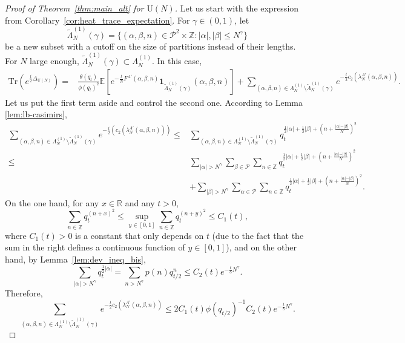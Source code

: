 \documentclass[11pt,a4paper,reqno]{article}
\theoremstyle{definition}
\theoremstyle{remark}
\newcommand\U{{\mathrm U}}
\newcommand\Z{{\mathbb Z}}
\newcommand\R{\mathbb{R}}
\newcommand\Tr{\mathrm{Tr}}
\newcommand\Pfr{\mathscr{P}}
\newcommand\E{\mathbb{E}}
\begin{document}
\begin{proof}[Proof of Theorem~\ref{thm:main_alt} for $\U(N)$]
Let us start with the expression from Corollary~\ref{cor:heat_trace_expectation}. For $\gamma\in(0,1)$, let
\[
\tilde{\Lambda}_N^{(1)}(\gamma)=\{(\alpha,\beta,n)\in\Pfr^2\times\Z:\vert\alpha\vert,\vert\beta\vert\leq N^\gamma\}
\]
be a new subset with a cutoff on the size of partitions instead of their lengths. For $N$ large enough, $\tilde{\Lambda}_N^{(1)}(\gamma)\subset\Lambda_N^{(1)}$. In this case, \begin{align*}
\Tr(e^{\frac{t}{2}\Delta_{\U(N)}})= & \frac{\theta(q_t)}{\phi(q_t)^2}\E\left[e^{-\frac{t}{N}F^{A'}(\alpha,\beta,n)}\mathbf{1}_{\tilde{\Lambda}_N^{(1)}(\gamma)}(\alpha,\beta,n)\right]+\sum_{(\alpha,\beta,n)\in\Lambda_N^{(1)}\setminus\tilde{\Lambda}_N^{(1)}(\gamma)} e^{-\frac{t}{2}c_2(\lambda_N^{A'}(\alpha,\beta,n))}.
\end{align*}
Let us put the first term aside and control the second one. According to Lemma \ref{lem:lb-casimirs},
\begin{align*}
\sum_{(\alpha,\beta,n)\in\Lambda_N^{(1)}\setminus\tilde{\Lambda}_N^{(1)}(\gamma)} e^{-\frac{t}{2}\left(c_2(\lambda_N^{A'}(\alpha,\beta,n))\right)}
 \leq & \sum_{(\alpha,\beta,n)\in\Lambda_N^{(1)}\setminus\tilde{\Lambda}_N^{(1)}(\gamma)} q_t^{\frac12\vert\alpha\vert+\frac12\vert\beta\vert+\left(n+\frac{\vert\alpha\vert-\vert\beta\vert}{N}\right)^2}\\
\leq & \sum_{\vert\alpha\vert>N^\gamma}\sum_{\beta\in\Pfr}\sum_{n\in\Z}q_t^{\frac12\vert\alpha\vert+\frac12\vert\beta\vert+\left(n+\frac{\vert\alpha\vert-\vert\beta\vert}{N}\right)^2}\\
& + \sum_{\vert\beta\vert>N^\gamma}\sum_{\alpha\in\Pfr}\sum_{n\in\Z}q_t^{\frac12\vert\alpha\vert+\frac12\vert\beta\vert+\left(n+\frac{\vert\alpha\vert-\vert\beta\vert}{N}\right)^2}.
\end{align*}
On the one hand, for any $x\in\R$ and any $t>0$,
\[
\sum_{n\in\Z}q_t^{(n+x)^2}\leq \sup_{y\in[0,1]}\sum_{n\in\Z}q_t^{(n+y)^2}\leq C_1(t),
\]
where $C_1(t)>0$ is a constant that only depends on $t$ (due to the fact that the sum in the right defines a continuous function of $y\in[0,1]$), and on the other hand, by Lemma~\ref{lem:dev_ineq_bis},
\[
\sum_{\vert\alpha\vert>N^\gamma}q_t^{\frac12\vert\alpha\vert}=
\sum_{n > N^\gamma} p(n) q_{t/2}^{n} \leq C_2(t)e^{-\frac{t}{8}N^\gamma}.
\]
Therefore,
\[
\sum_{(\alpha,\beta,n)\in\Lambda_N^{(1)}\setminus\tilde{\Lambda}_N^{(1)}(\gamma)} e^{-\frac{t}{2}c_2(\lambda_N^{A'}(\alpha,\beta,n))}\leq 2C_1(t)\phi(q_{t/2})^{-1}C_2(t)e^{-\frac{t}{8}N^\gamma}.
\]
\end{proof}
\end{document}
